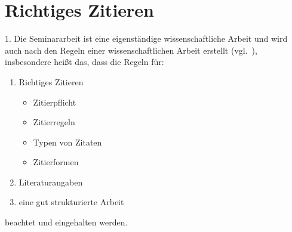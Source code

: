 \chapter{Richtiges Zitieren}

1.	Die Seminararbeit ist eine eigenständige wissenschaftliche Arbeit und wird auch nach den Regeln einer wissenschaftlichen Arbeit erstellt (vgl.~\cite{RichtigesZitierenTUDresden}), insbesondere heißt das, dass die Regeln für:
\begin{enumerate}
\item Richtiges Zitieren 
\begin{itemize}
\item Zitierpflicht
\item Zitierregeln
\item Typen von Zitaten
\item Zitierformen
\end{itemize}
\item Literaturangaben 
\item eine gut strukturierte Arbeit 
\end{enumerate}
beachtet und eingehalten werden.



